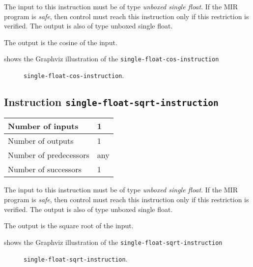 The input to this instruction must be of type \emph{unboxed single
  float}.  If the MIR program is \emph{safe}, then control must reach
this instruction only if this restriction is verified.  The output is
also of type unboxed single float.

The output is the cosine of the input.

 shows the Graphviz illustration of the
\texttt{single-float-cos-instruction}

\begin{figure}
\begin{center}
\end{center}
\caption{\label{fig-single-float-cos-instruction}
\texttt{single-float-cos-instruction}.}
\end{figure}

\subsection{Instruction \texttt{single-float-sqrt-instruction}}
\label{mir-instruction-single-float-div}

\begin{tabular}{|l|l|}
\hline
Number of inputs & 1\\
\hline
Number of outputs & 1\\
\hline
Number of predecessors & any\\
\hline
Number of successors & 1\\
\hline
\end{tabular}

The input to this instruction must be of type \emph{unboxed single
  float}.  If the MIR program is \emph{safe}, then control must reach
this instruction only if this restriction is verified.  The output is
also of type unboxed single float.

The output is the square root of the input.

 shows the Graphviz illustration of the
\texttt{single-float-sqrt-instruction}

\begin{figure}
\begin{center}
\end{center}
\caption{\label{fig-single-float-sqrt-instruction}
\texttt{single-float-sqrt-instruction}.}
\end{figure}

